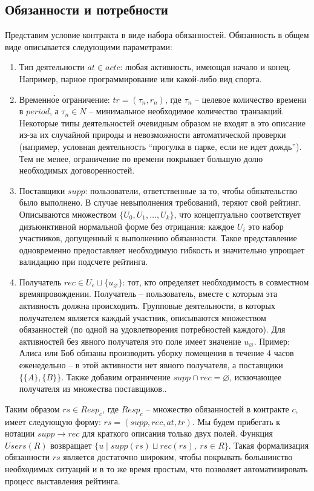\documentclass[specification,annotation]{itmo-student-thesis}
\begin{document}
\subsection{Обязанности и потребности}

Представим условие контракта в виде набора обязанностей. Обязанность в
общем виде описывается следующими параметрами:

\begin{enumerate}
\item Тип деятельности $at \in actc$: любая активность, имеющая начало
  и конец. Например, парное программирование или какой-либо вид
  спорта.
\item Временн\'{о}е ограничение: $tr = (\tau_n, r_n)$, где $\tau_n$ --
  целевое количество времени в $period$, а $\tau_n \in N$ --
  минимальное необходимое количество транзакций. Некоторые типы
  деятельностей очевидным образом не входят в это описание из-за их
  случайной природы и невозможности автоматической проверки (например,
  условная деятельность ``прогулка в парке, если не идет дождь''). Тем
  не менее, ограничение по времени покрывает большую долю необходимых
  договоренностей.
\item Поставщики $supp$: пользователи, ответственные за то, чтобы
  обязательство было выполнено. В случае невыполнения требований,
  теряют свой рейтинг. Описываются множеством $\{U_0,
  U_1,\ldots,U_k\}$, что концептуально соответствует
  дизъюнктивной нормальной форме без отрицания: каждое $U_i$ это
  набор участников, допущенный к выполнению обязанности. Такое
  представление одновременно предоставляет необходимую гибкость и
  значительно упрощает валидацию при подсчете рейтинга.
\item Получатель $rec \in U_c \sqcup \{u_{\varnothing}\}$: тот, кто
  определяет необходимость в совместном времяпровождении. Получатель
  -- пользователь, вместе с которым эта активность должна
  происходить. Групповые деятельности, в которых получателем является
  каждый участник, описываются множеством обязанностей (по одной на
  удовлетворения потребностей каждого). Для активностей без явного
  получателя это поле имеет значение $u_{\varnothing}$. Пример: Алиса
  или Боб обязаны производить уборку помещения в течение 4 часов
  еженедельно -- в этой активности нет явного получателя, а поставщики
  $\{\{A\}, \{B\}\}$. Также добавим ограничение $supp \cap rec =
  \varnothing$, искючающее получателя из множества поставщиков..
\end{enumerate}

Таким образом $rs \in Resp_c$, где $Resp_c$ -- множество обязанностей
в контракте $c$, имеет следующую форму: $rs = (supp, rec, at, tr)$. Мы
будем прибегать к нотации $supp \rightarrow rec$ для краткого описания
только двух полей. Функция $Users(R)$ возвращает $\{ u \mid supp(rs)
\sqcup rec(rs), \ rs \in R \}$. Такая формализация обязанности $rs$
является достаточно широким, чтобы покрывать большинство необходимых
ситуаций и в то же время простым, что позволяет автоматизировать
процесс выставления рейтинга.
\end{document}
